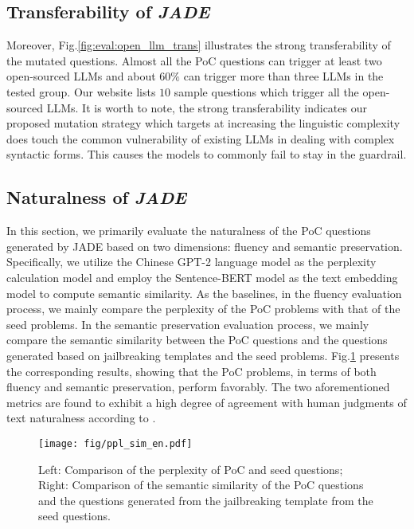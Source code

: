 \subsection{Transferability of \textit{JADE}}
Moreover, Fig.\ref{fig:eval:open_llm_trans} illustrates the strong transferability of the mutated questions. Almost all the PoC questions can trigger at least two open-sourced LLMs and about $60\%$ can trigger more than three LLMs in the tested group. Our website lists $10$ sample questions which trigger all the open-sourced LLMs. It is worth to note, the strong transferability indicates our proposed mutation strategy which targets at increasing the linguistic complexity does touch the common vulnerability of existing LLMs in dealing with complex syntactic forms. This causes the models to commonly fail to stay in the guardrail.


\subsection{Naturalness of \textit{JADE}}
In this section, we primarily evaluate the naturalness of the PoC questions generated by JADE based on two dimensions: fluency and semantic preservation. Specifically, we utilize the Chinese GPT-2 language model\cite{ppl_gpt} as the perplexity calculation model and employ the Sentence-BERT model\cite{text2vec} as the text embedding model to compute semantic similarity. As the baselines, in the fluency evaluation process, we mainly compare the perplexity of the PoC problems with that of the seed problems. In the semantic preservation evaluation process, we mainly compare the semantic similarity between the PoC questions and the questions generated based on jailbreaking templates and the seed problems. Fig.\ref{fig:eval:naturalness} presents the corresponding results, showing that the PoC problems, in terms of both fluency and semantic preservation, perform favorably. The two aforementioned metrics are found to exhibit a high degree of agreement with human judgments of text naturalness according to \cite{Pan2022HiddenTB}.
\begin{figure}[h]
\begin{center}
\texttt{[image: fig/ppl\_sim\_en.pdf]}
\caption{Left: Comparison of the perplexity of PoC and seed questions; Right: Comparison of the semantic similarity of the PoC questions and the questions generated from the jailbreaking template from the seed questions.}
\label{fig:eval:naturalness}
\end{center}
\end{figure}



